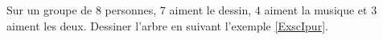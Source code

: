 
\begin{exercice}\label{exoPremiere-0065}

    Sur un groupe de \( 8\) personnes, \( 7\) aiment le dessin, \( 4\) aiment la musique et \( 3\) aiment les deux. Dessiner l'arbre en suivant l'exemple \ref{ExscIpur}.

\end{exercice}
